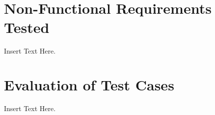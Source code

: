 \documentclass[12pt]{article}
\begin{document}
\section{Non-Functional Requirements Tested}
Insert Text Here.

\section{Evaluation of Test Cases}
Insert Text Here.
\end{document}
